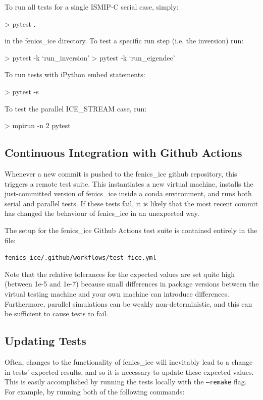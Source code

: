 \documentclass[11pt, reqno, nocenter]{article}
\begin{document}
To run all tests for a single ISMIP-C serial case, simply:
\begin{spverbatim}
> pytest .
\end{spverbatim}
in the fenics\_ice directory. To test a specific run step (i.e. the inversion) run:

\begin{spverbatim}
> pytest -k `run_inversion'
> pytest -k `run_eigendec'
\end{spverbatim}

To run tests with iPython embed statements:
\begin{spverbatim}
> pytest -s
\end{spverbatim}

To test the parallel ICE\_STREAM case, run:
\begin{spverbatim}
> mpirun -n 2 pytest
\end{spverbatim}

\subsection{Continuous Integration with Github Actions}

Whenever a new commit is pushed to the fenics\_ice github repository, this triggers a remote test suite. This instantiates a new virtual machine, installs the just-committed version of fenics\_ice inside a conda environment, and runs both serial and parallel tests. If these tests fail, it is likely that the most recent commit has changed the behaviour of fenics\_ice in an unexpected way.

The setup for the fenics\_ice Github Actions test suite is contained entirely in the file:

\texttt{fenics\_ice/.github/workflows/test-fice.yml}

Note that the relative tolerances for the expected values are set quite high (between 1e-5 and 1e-7) because small differences in package versions between the virtual testing machine and your own machine can introduce differences. Furthermore, parallel simulations can be weakly non-deterministic, and this can be sufficient to cause tests to fail.

\subsection{Updating Tests}

Often, changes to the functionality of fenics\_ice will inevitably lead to a change in tests' expected results, and so it is necessary to update these expected values. This is easily accomplished by running the tests locally with the \texttt{--remake} flag. For example, by running both of the following commands:
\end{document}

